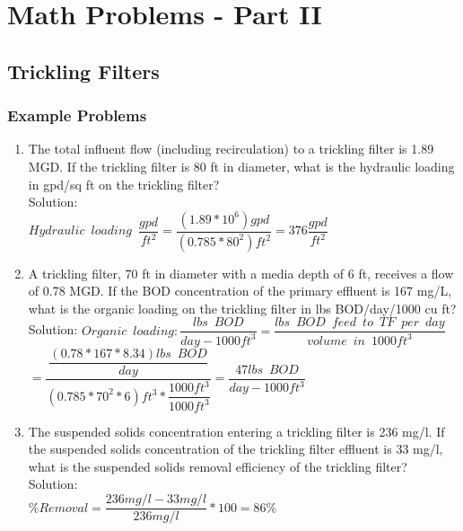 
\chapter{Math Problems - Part II}

\section{Trickling Filters}

\subsection{Example Problems} 

\begin{enumerate}


\item The total influent flow (including recirculation) to a trickling filter is 1.89 MGD. If the trickling filter is 80 ft in diameter, what is the hydraulic loading in gpd/sq ft on the trickling filter?\\
Solution:\\
$Hydraulic \enspace loading \enspace \dfrac{gpd}{ft^2}=\dfrac{(1.89*10^6)gpd}{(0.785*80^2)ft^2} =\boxed{376\dfrac{gpd}{ft^2}}$

\item A trickling filter, 70 ft in diameter with a media depth of 6 ft, receives a flow of 0.78 MGD. If the BOD concentration of the primary effluent is 167 mg/L, what is the organic loading on the trickling filter in lbs BOD/day/1000 cu ft?\\
Solution:  $Organic \enspace loading:\dfrac{lbs \enspace BOD}{day-1000ft^3}=\dfrac{lbs \enspace BOD \enspace feed \enspace to \enspace TF \enspace per \enspace day}{volume \enspace in \enspace 1000ft^3}$\\
$=\dfrac{\dfrac{(0.78*167*8.34)lbs \enspace BOD}{day}}{(0.785*70^2*6)ft^3*\dfrac{1000ft^3}{1000ft^3}}=\boxed{\dfrac{47 lbs \enspace BOD}{day-1000 ft^3}}$

\item The suspended solids concentration entering a trickling filter is 236 mg/l. If the suspended solids concentration of the trickling filter effluent is 33 mg/l, what is the suspended solids removal efficiency of the trickling filter?\\
Solution:\\
$\% Removal=\dfrac{236 mg/l-33 mg/l}{236 mg/l}*100=\boxed{86\%}$



\end{enumerate}
